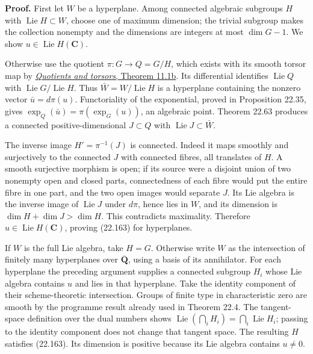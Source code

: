 \documentclass[
  11pt,
  a4paper,
]{article}
\newcounter{none} %
\begin{document}
\textbf{Proof.} First let \(W\) be a hyperplane. Among connected
algebraic subgroups \(H\) with \(\operatorname{Lie}H\subset W\), choose
one of maximum dimension; the trivial subgroup makes the collection
nonempty and the dimensions are integers at most \(\dim G-1\). We show
\(u\in\operatorname{Lie}H(\mathbf C)\).

Otherwise use the quotient \(\pi:G\to Q=G/H\), which exists with its
smooth torsor map by
\href{https://kokunoyumeto.github.io/open-math-courses-public/courses/AG-GS/AG-GS-04.html\#11-categorical-and-geometric-quotients}{\emph{Quotients
and torsors}, Theorem 11.1b}. Its differential identifies
\(\operatorname{Lie}Q\) with
\(\operatorname{Lie}G/\operatorname{Lie}H\). Thus
\(\bar W=W/\operatorname{Lie}H\) is a hyperplane containing the nonzero
vector \(\bar u=d\pi(u)\). Functoriality of the exponential, proved in
Proposition 22.35, gives \(\exp_Q(\bar u)=\pi(\exp_G(u))\), an algebraic
point. Theorem 22.63 produces a connected positive-dimensional
\(J\subset Q\) with \(\operatorname{Lie}J\subset\bar W\).

The inverse image \(H'=\pi^{-1}(J)\) is connected. Indeed it maps
smoothly and surjectively to the connected \(J\) with connected fibres,
all translates of \(H\). A smooth surjective morphism is open; if its
source were a disjoint union of two nonempty open and closed parts,
connectedness of each fibre would put the entire fibre in one part, and
the two open images would separate \(J\). Its Lie algebra is the inverse
image of \(\operatorname{Lie}J\) under \(d\pi\), hence lies in \(W\),
and its dimension is \(\dim H+\dim J>\dim H\). This contradicts
maximality. Therefore \(u\in\operatorname{Lie}H(\mathbf C)\), proving
(22.163) for hyperplanes.

If \(W\) is the full Lie algebra, take \(H=G\). Otherwise write \(W\) as
the intersection of finitely many hyperplanes over
\(\overline{\mathbf Q}\), using a basis of its annihilator. For each
hyperplane the preceding argument supplies a connected subgroup \(H_i\)
whose Lie algebra contains \(u\) and lies in that hyperplane. Take the
identity component of their scheme-theoretic intersection. Groups of
finite type in characteristic zero are smooth by the programme result
already used in Theorem 22.4. The tangent-space definition over the dual
numbers shows
\(\operatorname{Lie}(\bigcap_iH_i)=\bigcap_i\operatorname{Lie}H_i\);
passing to the identity component does not change that tangent space.
The resulting \(H\) satisfies (22.163). Its dimension is positive
because its Lie algebra contains \(u\ne0\).
\end{document}
